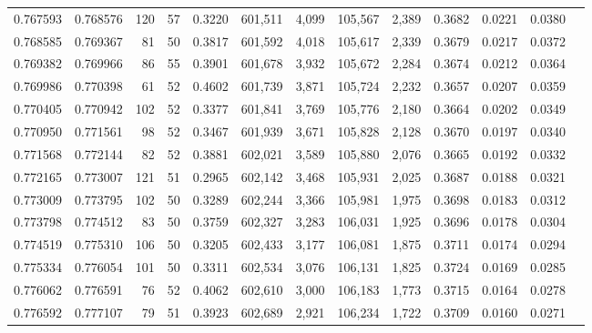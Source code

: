 \begin{tabular}{rrrrrrrrrrrrr}
0.767593 & 0.768576 &   120 &  57 &                                     0.3220 & 601,511 &   4,099 & 105,567 &   2,389 & 0.3682 & 0.0221 & 0.0380 \\
0.768585 & 0.769367 &    81 &  50 &                                     0.3817 & 601,592 &   4,018 & 105,617 &   2,339 & 0.3679 & 0.0217 & 0.0372 \\
0.769382 & 0.769966 &    86 &  55 &                                     0.3901 & 601,678 &   3,932 & 105,672 &   2,284 & 0.3674 & 0.0212 & 0.0364 \\
0.769986 & 0.770398 &    61 &  52 &                                     0.4602 & 601,739 &   3,871 & 105,724 &   2,232 & 0.3657 & 0.0207 & 0.0359 \\
0.770405 & 0.770942 &   102 &  52 &                                     0.3377 & 601,841 &   3,769 & 105,776 &   2,180 & 0.3664 & 0.0202 & 0.0349 \\
0.770950 & 0.771561 &    98 &  52 &                                     0.3467 & 601,939 &   3,671 & 105,828 &   2,128 & 0.3670 & 0.0197 & 0.0340 \\
0.771568 & 0.772144 &    82 &  52 &                                     0.3881 & 602,021 &   3,589 & 105,880 &   2,076 & 0.3665 & 0.0192 & 0.0332 \\
0.772165 & 0.773007 &   121 &  51 &                                     0.2965 & 602,142 &   3,468 & 105,931 &   2,025 & 0.3687 & 0.0188 & 0.0321 \\
0.773009 & 0.773795 &   102 &  50 &                                     0.3289 & 602,244 &   3,366 & 105,981 &   1,975 & 0.3698 & 0.0183 & 0.0312 \\
0.773798 & 0.774512 &    83 &  50 &                                     0.3759 & 602,327 &   3,283 & 106,031 &   1,925 & 0.3696 & 0.0178 & 0.0304 \\
0.774519 & 0.775310 &   106 &  50 &                                     0.3205 & 602,433 &   3,177 & 106,081 &   1,875 & 0.3711 & 0.0174 & 0.0294 \\
0.775334 & 0.776054 &   101 &  50 &                                     0.3311 & 602,534 &   3,076 & 106,131 &   1,825 & 0.3724 & 0.0169 & 0.0285 \\
0.776062 & 0.776591 &    76 &  52 &                                     0.4062 & 602,610 &   3,000 & 106,183 &   1,773 & 0.3715 & 0.0164 & 0.0278 \\
0.776592 & 0.777107 &    79 &  51 &                                     0.3923 & 602,689 &   2,921 & 106,234 &   1,722 & 0.3709 & 0.0160 & 0.0271 \\

\end{tabular}
